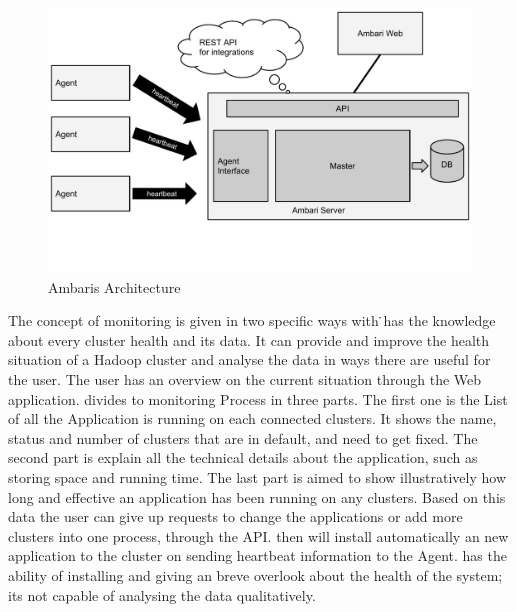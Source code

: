 \begin{figure}[hbt]
  \centering
  \includegraphics[width=\linewidth,clip=true,trim=0 3cm 0 0]{images/AmbariArchitecture}
  \caption{Ambaris Architecture~\cite{Sako}}
  \label{fig:AmbariArchitecture}
\end{figure}

The concept of monitoring is given in two specific ways with \amb\. \amb has the knowledge about every cluster health and its data.\cite{Foley2012} It can provide and improve the health situation of a Hadoop cluster and analyse the data in ways there are useful for the user.\cite{Foley2012} The user has an overview on the current situation through the Web application.\cite{Foley2012} \amb divides to monitoring Process in three parts. \cite{Foley2012}The first one is the List of all the Application \amb is running on each connected clusters. It shows the name, status and number of clusters that are in default, and need to get fixed.\cite{Foley2012} The second part is explain all the technical details about the application, such as storing space and running time.\cite{Foley2012} The last part is aimed to show illustratively how long and effective an application has been running on any clusters. \cite{Foley2012}Based on this data the user can give up requests to change the applications or add more clusters into one process, through the API. \cite{Sako}\amb then will install automatically an new application to the cluster on sending heartbeat information to the \amb Agent.\cite{Sako} \amb has the ability of installing and giving an breve overlook about the health of the system; its not capable of analysing the data qualitatively.\cite{Sako}

